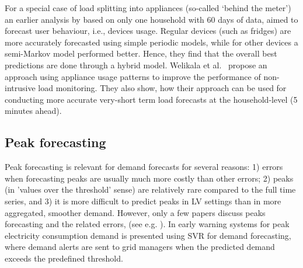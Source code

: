 For a special case of load splitting into appliances (so-called `behind the meter') an earlier analysis by \cite{bao2011ubp} based on only one household with 60 days of data, aimed to forecast user behaviour, i.e., devices usage. Regular devices (such as fridges) are more accurately forecasted using simple periodic models, while for other devices a semi-Markov model performed better. Hence, they find that the overall best predictions are done through a hybrid model. Welikala et al.~\cite{welikala2017iau} propose an approach using appliance usage patterns to improve the performance of non-intrusive load monitoring. They also show, how their approach can be used for conducting more accurate very-short term load forecasts at the household-level (5 minutes ahead). 


\subsection{Peak forecasting}  \label{sec:application_specific}

Peak forecasting is relevant for demand forecasts for several reasons: 1) errors when forecasting peaks are usually much more costly than other errors; 2) peaks (in 'values over the threshold' sense)  are relatively rare compared to the full time series,  and 3)  it is more difficult to predict peaks in LV settings than in more aggregated, smoother demand. However, only a few papers discuss peaks forecasting and the related errors,  (see e.g. \cite{chaouch2015rcq, Jacob2020faa}). In \cite{Komatsu2020pda} early warning systems for peak electricity consumption demand is presented using SVR for demand forecasting, where demand alerts are sent to grid managers when the predicted demand exceeds the predefined threshold. 


